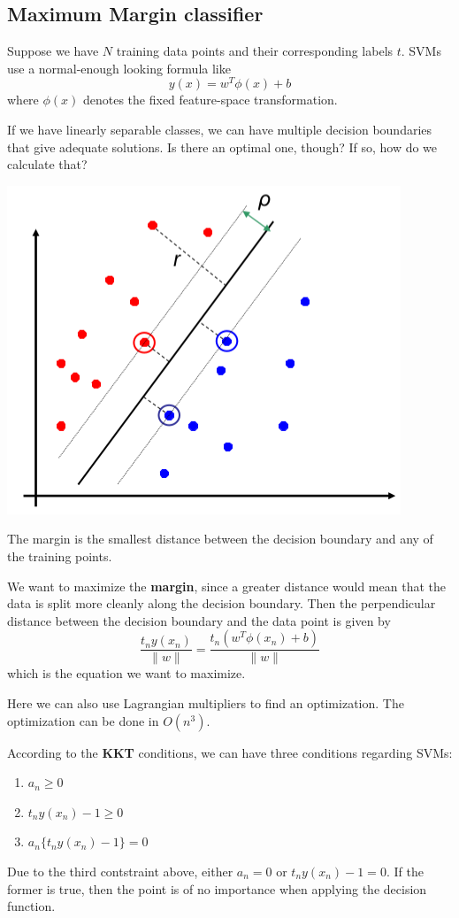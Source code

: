 \documentclass{tufte-handout}
\begin{document}
	\subsection{Maximum Margin classifier}
		Suppose we have $N$ training data points and their corresponding labels $t$. SVMs use
		a normal-enough looking formula like 
		\[y(x) = w^{T}\phi(x) + b\]
		where $\phi(x)$ denotes the fixed feature-space transformation.
		
		If we have linearly separable classes, we can have multiple decision boundaries that
		give adequate solutions. Is there an optimal one, though? If so, how do we calculate that?

		\begin{marginfigure}		
			\includegraphics[scale=0.3]{margin}
			\caption{The margin is the smallest distance between the decision boundary and any of
				the training points.}
		\end{marginfigure}	

		We want to maximize the \textbf{margin}, since a greater distance would mean that the data is 
		split more cleanly along the decision boundary. Then the perpendicular distance between the 
		decision boundary and the data point is given by 
		\[ \frac{t_{n}y(x_{n})}{\|w\|} = \frac{t_{n}(w^{T}\phi(x_{n}) + b)}{\|w\|}\]
		which is the equation we want to maximize.
		
		Here we can also use Lagrangian multipliers to find an optimization. The optimization can be done
		in $O(n^{3})$.
		
		According to the \textbf{KKT} conditions, we can have three conditions regarding SVMs:
		\begin{enumerate}
			\item $a_{n} \geq 0$
			\item $t_{n}y(x_{n}) -1 \geq 0$
			\item $a_{n}\{t_{n}y(x_{n})-1\} = 0$
		\end{enumerate}
		Due to the third contstraint above, either $a_{n} = 0$ or $t_{n}y(x_{n}) - 1 = 0$. If the former
		is true, then the point is of no importance when applying the decision function.
\end{document}
